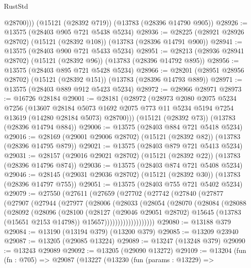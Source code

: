 \begin{lexlean}{RustStd}
\begin{coremodule}
          @28700)))
    (@15121 (@28392 @719))
    (@13783 (@28396 @14790 @905))
@28926 := @13575 (@28403 @905 @721 @5438 @5234)
@28936 := @28225 (@28921 @28926 @28702) (@15121 (@28392 @108)) (@13783 (@28396 @14791 @900))
@28941 := @13575 (@28403 @900 @721 @5433 @5234)
@28951 := @28213 (@28936 @28941 @28702) (@15121 (@28392 @96)) (@13783 (@28396 @14792 @895))
@28956 := @13575 (@28403 @895 @721 @5428 @5234)
@28966 := @28201 (@28951 @28956 @28702) (@15121 (@28392 @151)) (@13783 (@28396 @14793 @889))
@28971 := @13575 (@28403 @889 @912 @5423 @5234)
@28972 := @28966 @28971
@28973 := @16726 @28184
@29001 := @28181
    (@28972
      (@28973
        @2080
        @2075
        @5234
        @7256
        (@13607
          @28184
          @5073
          @1692
          @2075
          @773
          @11
          @5234
          @5194
          @7254
          @13619
          (@14280 @28184 @5073)
          @28700)))
    (@15121 (@28392 @73))
    (@13783 (@28396 @14794 @884))
@29006 := @13575 (@28403 @884 @721 @5418 @5234)
@29016 := @28169 (@29001 @29006 @28702) (@15121 (@28392 @82)) (@13783 (@28396 @14795 @879))
@29021 := @13575 (@28403 @879 @721 @5413 @5234)
@29031 := @28157 (@29016 @29021 @28702) (@15121 (@28392 @22)) (@13783 (@28396 @14796 @874))
@29036 := @13575 (@28403 @874 @721 @5408 @5234)
@29046 := @28145 (@29031 @29036 @28702) (@15121 (@28392 @30)) (@13783 (@28396 @14797 @755))
@29051 := @13575 (@28403 @755 @721 @5402 @5234)
@29079 := @27550
    (@27611
      (@27659
        (@27702
          (@27742
            (@27840
              (@27877
                (@27907
                  (@27944
                    (@27977
                      (@28006
                        (@28033
                          (@28054
                            (@28070
                              (@28084
                                (@28088
                                  (@28092
                                    (@28096
                                      (@28100
                                        (@28127
                                          (@29046 @29051 @28702)
                                          @15645
                                          (@13783 (@15651 @2153 @14798))
                                          @15657)))))))))))))))))))
@29080 := @13188 @379
@29084 := @13190 (@13194 @379) (@13200 @379)
@29085 := @13209 @23940
@29087 := @13205 (@29085 @13224)
@29089 := @13247 (@13248 @379)
@29090 := @13243 @29089
@29092 := @13205 (@29090 @13272)
@29109 := @13204
    (fun (fn : @705) =>
    @29087
      (@13227
        (@13230
          (fun (params : @13229) =>

\end{coremodule}
\end{lexlean}
